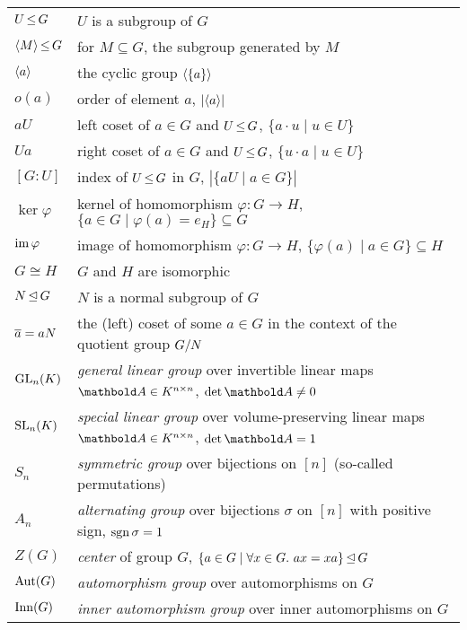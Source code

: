 \begin{fullwidth}
\section*{}
\begin{longtable}{p{2cm}l}
    $U \operatorname*{\leq} G$ & $U$ is a subgroup of $G$ \\
    $\langle M \rangle \operatorname*{\leq} G$ & for $M \subseteq G$, the subgroup generated by $M$ \\
    $\langle a \rangle$ & the cyclic group $\langle \{a\} \rangle$ \\
    $o(a)$ & order of element $a$, $|\langle a \rangle|$ \\
    $aU$ & left coset of $a \in G$ and $U \operatorname*{\leq} G$, $\{a \cdot u \mid u \in U\}$ \\
    $Ua$ & right coset of $a \in G$ and $U \operatorname*{\leq} G$, $\{u \cdot a \mid u \in U\}$ \\
    $[G:U]$ & index of $U \operatorname*{\leq} G$ in $G$, $|\{aU \mid a \in G\}|$ \\
    $\ker \varphi$ & kernel of homomorphism $\varphi : G \to H$, $\{a \in G \mid \varphi(a) = e_H\} \subseteq G$ \\
    $\operatorname*{im} \varphi$ & image of homomorphism $\varphi : G \to H$, $\{\varphi(a) \mid a \in G\} \subseteq H$ \\
    $G \cong H$ & $G$ and $H$ are isomorphic \\
    $N \operatorname*{\trianglelefteq} G$ & $N$ is a normal subgroup of $G$ \\
    $\overline{a} = a N$ & the (left) coset of some $a \in G$ in the context of the quotient group $G/N$ \\
    \addlinespace
    $\mathrm{GL}_{n}(K)$ & \emph{general linear group} over invertible linear maps $\mA \in K^{n \times n}$, $\det{\mA} \neq 0$ \\
    $\mathrm{SL}_{n}(K)$ & \emph{special linear group} over volume-preserving linear maps $\mA \in K^{n \times n}$, $\det{\mA} = 1$ \\
    $S_n$ & \emph{symmetric group} over bijections on $[n]$ (so-called permutations) \\
    $A_n$ & \emph{alternating group} over bijections $\sigma$ on $[n]$ with positive sign, $\operatorname*{sgn}{\sigma} = 1$ \\
    $Z(G)$ & \emph{center} of group $G$, $\{a \in G \mid \forall x \in G.\ ax = xa\} \operatorname*{\trianglelefteq} G$ \\
    $\mathrm{Aut}(G)$ & \emph{automorphism group} over automorphisms on $G$ \\
    $\mathrm{Inn}(G)$ & \emph{inner automorphism group} over inner automorphisms on $G$ \\

\end{longtable}
\end{fullwidth}
